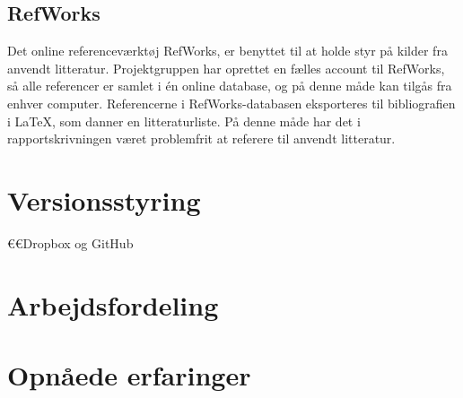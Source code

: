 	\subsection{RefWorks}
Det online referenceværktøj RefWorks, er benyttet til at holde styr på kilder fra anvendt litteratur. Projektgruppen har oprettet en fælles account til RefWorks, så alle referencer er samlet i én online database, og på denne måde kan tilgås fra enhver computer. Referencerne i RefWorks-databasen eksporteres til bibliografien i LaTeX, som danner en litteraturliste. På denne måde har det i rapportskrivningen været problemfrit at referere til anvendt litteratur.  
	
	



\section{Versionsstyring}
 	€€Dropbox og GitHub

\section{Arbejdsfordeling}

\section{Opnåede erfaringer}